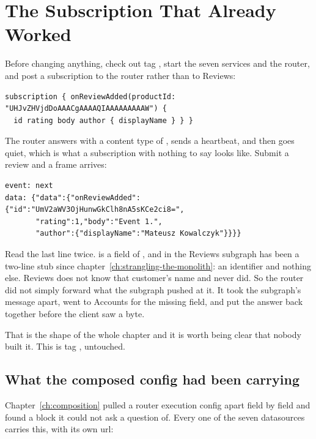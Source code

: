 \section{The Subscription That Already Worked}
\label{sec:ch14-the-subscription-that-already-worked}
%

Before changing anything, check out tag , start the seven services
and the router, and post a subscription to the router rather than to Reviews:

\begin{verbatim}
subscription { onReviewAdded(productId: "UHJvZHVjdDoAAACgAAAAQIAAAAAAAAAW") {
  id rating body author { displayName } } }
\end{verbatim}

The router answers  with a content type of
, sends a heartbeat, and then goes quiet, which is what
a subscription with nothing to say looks like. Submit a review and a frame
arrives:

\begin{verbatim}
event: next
data: {"data":{"onReviewAdded":{"id":"UmV2aWV3OjHunwGkClh8nA5sKCe2ci8=",
       "rating":1,"body":"Event 1.",
       "author":{"displayName":"Mateusz Kowalczyk"}}}}
\end{verbatim}

%
Read the last line twice.  is a field of
, and  in the Reviews subgraph has been a
two-line stub since chapter~\ref{ch:strangling-the-monolith}: an identifier and
nothing else. Reviews does not know that customer's name and never did. So the
router did not simply forward what the subgraph pushed at it. It took the
subgraph's message apart, went to Accounts for the missing field, and put the
answer back together before the client saw a byte.

That is the shape of the whole chapter and it is worth being clear that nobody
built it. This is tag , untouched.

\subsection*{What the composed config had been carrying}

%
Chapter~\ref{ch:composition} pulled a router execution config apart field by
field and found a block it could not ask a question of. Every one of the seven
datasources carries this, with its own url:

